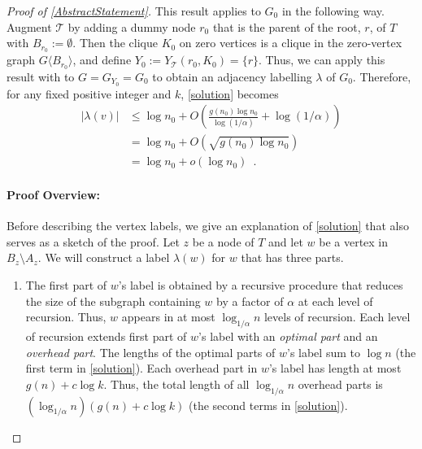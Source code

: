 \documentclass{patmorin}
\newcommand{\torso}[2]{{#1}\langle{#2}\rangle}
\renewcommand{\le}{\leqslant}
\newcommand{\defin}[1]{\emph{\textcolor{brightmaroon}{#1}}}
\let\eqref\cref
\begin{document}
\begin{proof}[Proof of \cref{AbstractStatement}]
    This result applies to $G_0$ in the following way.  Augment $\mathcal{T}$ by adding a dummy node $r_0$ that is the parent of the root, $r$, of $T$ with $B_{r_0}:=\emptyset$.  Then the clique $K_0$ on zero vertices is a clique in the zero-vertex graph $\torso{G}{B_{r_0}}$, and define $Y_0:=Y_\mathcal{T}(r_0,K_0)=\{r\}$. Thus, we can apply this result with to $G=G_{Y_0}=G_0$ to obtain an adjacency labelling $\lambda$ of $G_0$. Therefore, for any fixed positive integer and $k$, \eqref{solution} becomes
    \begin{align*}
      |\lambda(v)|
      & \le \log n_0 + O\left(\frac{g(n_0)\log n_0}{\log (1/\alpha)}+\log(1/\alpha)\right) \\
      & = \log n_0 + O\left(\sqrt{g(n_0)\log n_0}\right) \\
      & = \log n_0 + o(\log n_0) \enspace .
    \end{align*}

    \paragraph{Proof Overview:}
    Before describing the vertex labels, we give an explanation of \cref{solution} that also serves as a sketch of the proof.  Let $z$ be a node of $T$ and let $w$ be a vertex in $B_z\setminus A_z$. We will construct a label $\lambda(w)$ for $w$ that has three parts.
    \begin{enumerate}
      \item The first part of $w$'s label is obtained by a recursive procedure that reduces the size of the subgraph containing $w$ by a factor of $\alpha$ at each level of recursion.  Thus, $w$ appears in at most $\log_{1/\alpha} n$ levels of recursion.  Each level of recursion extends first part of $w$'s label with an \defin{optimal part} and an \defin{overhead part}.  The lengths of the optimal parts of $w$'s label sum to $\log n$ (the first term in \eqref{solution}).  Each overhead part in $w$'s label has length at most $g(n)+c\log k$. Thus, the total length of all $\log_{1/\alpha} n$ overhead parts is $(\log_{1/\alpha} n)(g(n)+c\log k)$ (the second terms in \eqref{solution}).


\end{enumerate}
\end{proof}
\end{document}
